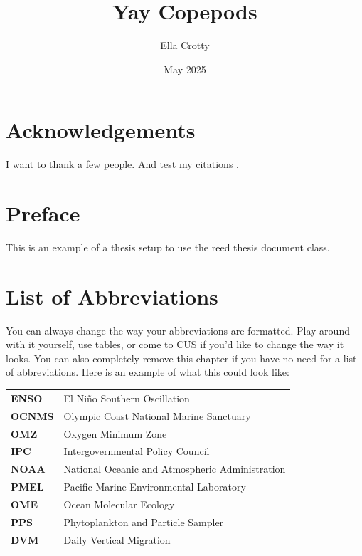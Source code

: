 \documentclass[12pt,twoside]{reedthesis}
\title{Yay Copepods}
\author{Ella Crotty}
\date{May 2025}
\begin{document}
  \maketitle
  \frontmatter %
  \pagestyle{empty} %

    \chapter*{Acknowledgements}
	I want to thank a few people.
	And test my citations \autocite{Barth2024}.

    \chapter*{Preface}
	This is an example of a thesis setup to use the reed thesis document class.
	
    \chapter*{List of Abbreviations}
		You can always change the way your abbreviations are formatted. Play around with it yourself, use tables, or come to CUS if you'd like to change the way it looks. You can also completely remove this chapter if you have no need for a list of abbreviations. Here is an example of what this could look like:

	\begin{table}[h]
	\centering %
	\begin{tabular}{ll}
		\textbf{ENSO}  	&  El Ni\~{n}o Southern Oscillation \\
		\textbf{OCNMS}  	&  Olympic Coast National Marine Sanctuary \\
		\textbf{OMZ}  	&  Oxygen Minimum Zone \\
		\textbf{IPC}  	&  Intergovernmental Policy Council \\
		\textbf{NOAA}  	&  National Oceanic and Atmospheric Administration \\
		\textbf{PMEL}  	&  Pacific Marine Environmental Laboratory \\
		\textbf{OME}  	&  Ocean Molecular Ecology \\
		\textbf{PPS}  	&  Phytoplankton and Particle Sampler \\
		\textbf{DVM}  	&  Daily Vertical Migration \\
	\end{tabular}
	\end{table}
	
\end{document}
